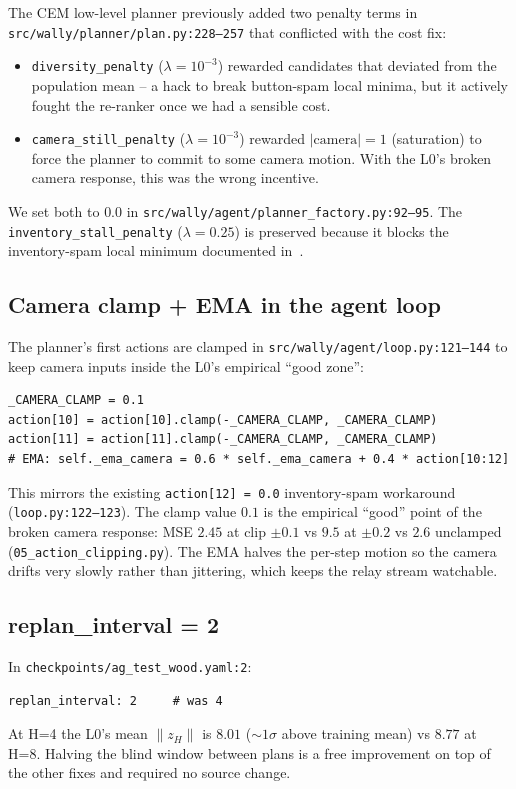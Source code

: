 \documentclass[11pt]{article}
\begin{document}
The CEM low-level planner previously added two penalty terms in
\texttt{src/wally/planner/plan.py:228--257} that conflicted with
the cost fix:
\begin{itemize}[leftmargin=*,itemsep=2pt]
\item \texttt{diversity\_penalty} ($\lambda = 10^{-3}$) rewarded
candidates that deviated from the population mean -- a hack to
break button-spam local minima, but it actively fought the
re-ranker once we had a sensible cost.
\item \texttt{camera\_still\_penalty} ($\lambda = 10^{-3}$)
rewarded $| \mathrm{camera} | = 1$ (saturation) to force the
planner to commit to some camera motion. With the L0's broken
camera response, this was the wrong incentive.
\end{itemize}
We set both to $0.0$ in
\texttt{src/wally/agent/planner_factory.py:92--95}. The
\texttt{inventory\_stall\_penalty} ($\lambda = 0.25$) is
preserved because it blocks the inventory-spam local minimum
documented in~\cite{wally:agent}.

\subsection{Camera clamp + EMA in the agent loop}

The planner's first actions are clamped in
\texttt{src/wally/agent/loop.py:121--144} to keep camera inputs
inside the L0's empirical ``good zone'':
\begin{verbatim}
_CAMERA_CLAMP = 0.1
action[10] = action[10].clamp(-_CAMERA_CLAMP, _CAMERA_CLAMP)
action[11] = action[11].clamp(-_CAMERA_CLAMP, _CAMERA_CLAMP)
# EMA: self._ema_camera = 0.6 * self._ema_camera + 0.4 * action[10:12]
\end{verbatim}
This mirrors the existing
\texttt{action[12] = 0.0} inventory-spam workaround
(\texttt{loop.py:122--123}). The clamp value $0.1$ is the empirical
``good'' point of the broken camera response: MSE $2.45$ at clip
$\pm 0.1$ vs $9.5$ at $\pm 0.2$ vs $2.6$ unclamped
(\texttt{05\_action\_clipping.py}). The EMA halves the per-step
motion so the camera drifts very slowly rather than jittering,
which keeps the relay stream watchable.

\subsection{replan\_interval = 2}

In \texttt{checkpoints/ag\_test\_wood.yaml:2}:
\begin{verbatim}
replan_interval: 2     # was 4
\end{verbatim}
At H=4 the L0's mean $\|z_H\|$ is $8.01$ ($\sim 1\sigma$ above
training mean) vs $8.77$ at H=8. Halving the blind window
between plans is a free improvement on top of the other fixes
and required no source change.
\end{document}
